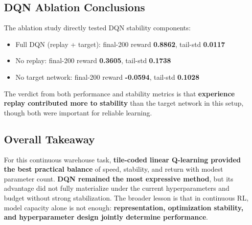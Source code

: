 \documentclass[10pt,twocolumn]{article}
\begin{document}
\subsection*{DQN Ablation Conclusions}
The ablation study directly tested DQN stability components:
\begin{itemize}
\item Full DQN (replay + target): final-200 reward \textbf{0.8862}, tail-std \textbf{0.0117}
\item No replay: final-200 reward \textbf{0.3605}, tail-std \textbf{0.1738}
\item No target network: final-200 reward \textbf{-0.0594}, tail-std \textbf{0.1028}
\end{itemize}

The verdict from both performance and stability metrics is that \textbf{experience replay contributed more to stability} than the target network in this setup, though both were important for reliable learning.

\subsection*{Overall Takeaway}
For this continuous warehouse task, \textbf{tile-coded linear Q-learning provided the best practical balance} of speed, stability, and return with modest parameter count. \textbf{DQN remained the most expressive method}, but its advantage did not fully materialize under the current hyperparameters and budget without strong stabilization. The broader lesson is that in continuous RL, model capacity alone is not enough: \textbf{representation, optimization stability, and hyperparameter design jointly determine performance}.


\nocite{*}




\end{document}
